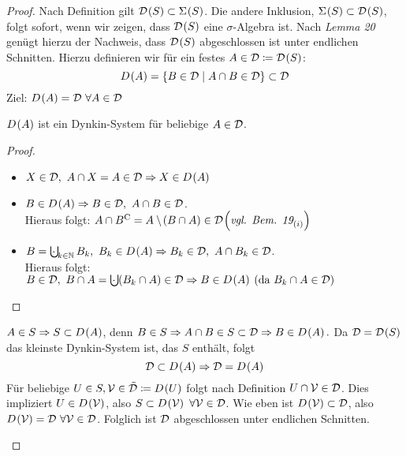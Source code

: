 \documentclass[skript.tex]{\mf{P}s}
\begin{document}
	\begin{proof}
		Nach Definition gilt $\D\pr{S} \sbs \Sigma\pr{S}$. Die andere Inklusion, $\Sigma\pr{S} \sbs \D\pr{S}$, folgt sofort, wenn wir zeigen, dass $\D\pr{S}$ eine $\sigma$-Algebra ist. Nach \textit{Lemma 20} genügt hierzu der Nachweis, dass $\D\pr{S}$ abgeschlossen ist unter endlichen Schnitten. Hierzu definieren wir für ein festes $A \in \D \ceq \D\pr{S}$:
		\begin{equation*}
			D\pr{A} = \cbr{B\in \D \mid A\cap B \in \D} \sbs \D 
		\end{equation*}
		Ziel: $D\pr{A} = \D\ \forall A\in \D$
		\begin{beh*}
			$D\pr{A}$ ist ein Dynkin-System für beliebige $A\in\mathcal{D}$.
		\end{beh*}
		
		\begin{proof}
			\hfill
			\begin{itemize}
				\item $X\in \D,\ A\cap X = A\in \D \Ra X \in D\pr{A}$
				\item $B\in D\pr{A} \Ra B \in \D,\ A\cap B \in \D$. \\Hieraus folgt:
					$A\cap \cp{B} = A\sm \pr{B\cap A} \in \D \pr{\textit{vgl. Bem. 19}_{(i)} }$
				\item $B = \bigcupdot_{k\in\N} B_k,\ B_k \in D\pr{A} \Ra B_k\in\D,\ A\cap B_k \in \D$.\\
					Hieraus folgt: $B\in\D,\ B\cap A = \bigcupdot\pr{B_k\cap A} \in \D \Ra B\in D\pr{A}\ \pr{\text{da }B_k\cap A \in \D}$
			\end{itemize}
		\end{proof}
		\begin{beh*}
			$A\in S \Ra S\sbs D\pr{A}$, denn $B\in S \Ra A\cap B \in S \sbs \D \Ra B\in D\pr{A}.$ Da $\D = \D\pr{S}$ das kleinste Dynkin-System ist, das $S$ enthält, folgt
			\begin{equation*}
				\D \sbs D\pr{A} \Ra \D = D\pr{A}
			\end{equation*}
			Für beliebige $U\in S, \mc{V} \in \tilde{\D} \ceq D\pr{U}$ folgt nach Definition $U\cap \mathcal{V} \in \mathcal{D}$. Dies impliziert $U \in D\pr{\mc{V}}$, also $S\sbs D\pr{\mc{V}}\ \forall \mc{V} \in \D$. Wie eben ist $D\pr{\mc{V}} \sbs \D$, also $D\pr{\mc{V}} = \D\ \forall \mc{V} \in \D$. Folglich ist $\mathcal{D}$ abgeschlossen unter endlichen Schnitten.
		\end{beh*}
	\end{proof}
\end{document}
